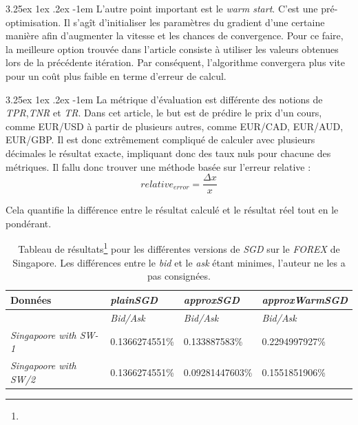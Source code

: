 \documentclass[a4paper, 11pt]{article}
\makeatletter
\newcounter{subsubsubsection}[subsubsection]
\renewcommand\paragraph{\@startsection{paragraph}{5}{\z@}%
  {3.25ex \@plus1ex \@minus.2ex}%
  {-1em}%
  {\normalfont\normalsize\bfseries}}
\makeatother
\begin{document}

\paragraph{}
L'autre point important est le \textit{warm start}. C'est une pré-optimisation. Il s'agît d'initialiser les paramètres du gradient d'une certaine manière afin d'augmenter la vitesse et les chances de convergence. Pour ce faire, la meilleure option trouvée dans l'article \cite{descente_du_gradient_stochastique} consiste à utiliser les valeurs obtenues lors de la précédente itération.
Par conséquent, l'algorithme convergera plus vite pour un coût plus faible en terme d'erreur de calcul.

\paragraph{}
La métrique d'évaluation est différente des notions de \textit{TPR},\textit{TNR} et \textit{TR}. Dans cet article, le but est de prédire le prix d'un cours, comme EUR/USD à partir de plusieurs autres, comme EUR/CAD, EUR/AUD, EUR/GBP. Il est donc extrêmement compliqué de calculer avec plusieurs décimales le résultat exacte, impliquant donc des taux nuls pour chacune des métriques.
Il fallu donc trouver une méthode basée sur l'erreur relative :
$$relative_{error} = \frac{\Delta x}{x}$$

Cela quantifie la différence entre le résultat calculé et le résultat réel tout en le pondérant.


\begin{table}[H]
	\centering
\begin{tabular}{|l|l|l|l|}
	\hline
	Données & \textit{plainSGD} & \textit{approxSGD} & \textit{approxWarmSGD}\\
	\hline
	\ & \textit{Bid/Ask} & \textit{Bid/Ask} & \textit{Bid/Ask} \\
	\hline
	\textit{Singapoore with SW-1\footnotemark{}} & 0.1366274551\% & 0.133887583\% & 0.2294997927\% \\
	\hline
	\textit{Singapoore with SW/2\footnotemark{}} & 0.1366274551\% & 0.09281447603\% & 0.1551851906\%\\
	\hline

\end{tabular}
\caption[]{Tableau de résultats\footnote[3]{} pour les différentes versions de \textit{SGD} sur le \textit{FOREX} de Singapore. Les différences entre le \textit{bid} et le \textit{ask} étant minimes, l'auteur ne les a pas consignées.}
\end{table}
\end{document}
